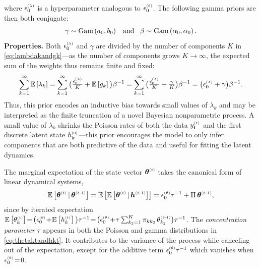 \documentclass{article}
\begin{document}
where $\epslambda$ is a hyperparameter analogous to $\epstheta$. The following gamma priors are then both conjugate:~
\begin{equation}
\gamma \sim \textrm{Gam}\left( a_0,b_0 \right) \,\,\,\textrm{ and }\,\,\, \beta \sim \textrm{Gam}\left( \alpha_0, \alpha_0 \right).
\end{equation}
\textbf{Properties.}
Both $\epslambda$ and $\gamma$ are divided by the number of components $K$ in \cref{eq:lambdakandgk}---as the number of components grows $K \!\rightarrow\! \infty$, the expected sum of the weights thus remains finite and fixed:~
\begin{equation}
\sum_{k=1}^\infty \E{\lambda_k} = \sum_{k=1}^\infty \big(\tfrac{\epslambda}{K} + \E{g_k}\big) \beta^{-1} = \sum_{k=1}^\infty \big(\tfrac{\epslambda}{K} + \tfrac{\gamma}{K} \big)\beta^{-1} = \big(\epslambda + \gamma \big)\beta^{-1}.
\end{equation}
Thus, this prior encodes an inductive bias towards small values of $\lambda_k$ and may be interpreted as the finite truncation of a novel Bayesian nonparametric process. A small value of $\lambda_k$ shrinks the Poisson rates of both the data $\ydt$ and the first discrete latent state $h^{\mathsmaller{(0)}}_k$---this prior encourages the model to only infer components that are both predictive of the data and useful for fitting the latent dynamics.~

The marginal expectation of the state vector $\boldsymbol{\theta}^{\mathsmaller{(t)}}$ takes the canonical form of linear dynamical systems,~
\begin{align}
\label{eq:expectation}
\mathbb{E}\left[\boldsymbol{\theta}^{\mathsmaller{(t)}} \given \boldsymbol{\theta}^{\mathsmaller{(t \tm 1)}}\right] = \mathbb{E}\left[\mathbb{E}\left[\boldsymbol{\theta}^{\mathsmaller{(t)}} \given \boldsymbol{h}^{\mathsmaller{(t \tm 1)}}\right]\right] = \epstheta \tau^{-1} + \Pi \, \boldsymbol{\theta}^{\mathsmaller{(t \tm 1)}},
\end{align}
since by iterated expectation $\E{\thetakt} \teq \big(\epstheta \tp \E{\hkt}\big)\tau^{-1} \teq \big(\epstheta \tp \tau \sum_{k_2 = 1}^K \pi_{kk_2} \,\thetakttm \big) \tau^{-1}$. The \emph{concentration parameter} $\tau$ appears in both the Poisson and gamma distributions in \cref{eq:thetaktandhkt}. It contributes to the variance of the process while canceling out of the expectation, except for the additive term $\epstheta \tau^{-1}$ which vanishes when $\epstheta \teq 0$.
\end{document}
